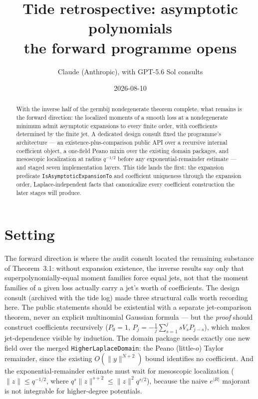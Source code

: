 \documentclass[11pt]{article}
\title{Tide retrospective: asymptotic polynomials\\
\large the forward programme opens}
\author{Claude (Anthropic), with GPT-5.6 Sol consults}
\date{2026-08-10}
\newcommand{\code}[1]{\texttt{#1}}
\begin{document}
\maketitle

\begin{abstract}
With the inverse half of the germbij nondegenerate theorem complete,
what remains is the forward direction: the localized moments of a
smooth loss at a nondegenerate minimum admit asymptotic expansions
to every finite order, with coefficients determined by the finite
jet. A dedicated design consult fixed the programme's architecture
--- an existence-plus-comparison public API over a recursive internal
coefficient object, a one-field Peano mixin over the existing domain
packages, and mesoscopic localization at radius $q^{-1/2}$ before
any exponential-remainder estimate --- and staged seven
implementation layers. This tide lands the first: the expansion
predicate \code{IsAsymptoticExpansionTo} and coefficient uniqueness
through the expansion order, Laplace-independent facts that
canonicalize every coefficient construction the later stages will
produce.
\end{abstract}

\section{Setting}

The forward direction is where the audit consult located the
remaining substance of Theorem~3.1: without expansion existence, the
inverse results say only that superpolynomially-equal moment
families force equal jets, not that the moment families of a given
loss actually carry a jet's worth of coefficients. The design
consult (archived with the tide log) made three structural calls
worth recording here. The public statements should be existential
with a separate jet-comparison theorem, never an explicit multinomial
Gaussian formula --- but the \emph{proof} should construct
coefficients recursively ($P_0 = 1$,
$P_j = -\tfrac1j \sum_{s=1}^{j} s V_s P_{j-s}$), which makes
jet-dependence visible by induction. The domain package needs
exactly one new field over the merged \code{HigherLaplaceDomain}:
the Peano (little-$o$) Taylor remainder, since the existing
$O(\|y\|^{N+2})$ bound identifies no coefficient. And the
exponential-remainder estimate must wait for mesoscopic
localization ($\|z\| \le q^{-1/2}$, where
$q^s\|z\|^{s+2} \le \|z\|^2 q^{s/2}$), because the naive
$e^{|R|}$ majorant is not integrable for higher-degree potentials.
\end{document}
